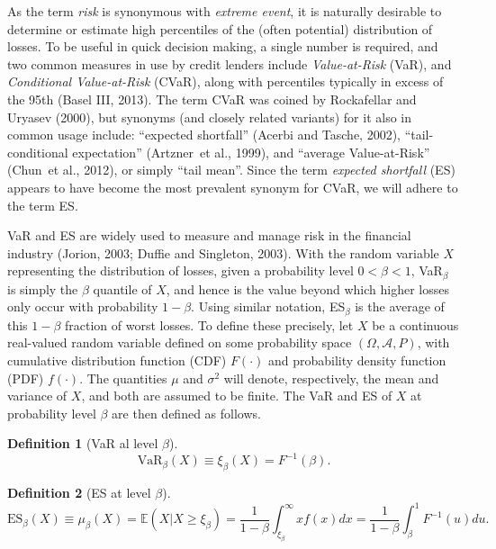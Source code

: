 \documentclass[11pt]{article}
\newcommand{\E}{\mathbb{E}}
\newcommand{\etal}{et al.}
\newcommand{\var}{\ensuremath{\xi_{\beta}}}
\newcommand{\cvar}{\ensuremath{\mu_{\beta}}}
\newcommand{\al}{\ensuremath{\beta}}
\newcommand{\nc}{\normalcolor}
\newtheorem{defn}{Definition}%
\begin{document}
As the term \emph{risk} is synonymous
with \emph{extreme event}, it is naturally desirable to determine or
estimate high percentiles of the (often potential) distribution of
losses. To be useful in quick decision making, a single number is
required, and two common measures in use by credit lenders include  \emph{Value-at-Risk} (VaR), and \emph{Conditional
Value-at-Risk} (CVaR), along with percentiles typically in excess
of the 95th (Basel III, 2013).
The term CVaR was coined by Rockafellar and
Uryasev (2000), but synonyms (and closely related variants) for it also in common usage include: ``expected shortfall'' (Acerbi
and Tasche, 2002), ``tail-conditional expectation'' (Artzner~\etal{},
1999), and ``average Value-at-Risk'' (Chun~\etal{},
2012), or simply ``tail mean''. 
Since the term \emph{expected
shortfall} (ES) appears to have become the most prevalent synonym for CVaR, we
will adhere to the term ES.\nc

VaR and ES  are widely used to measure and manage risk in the financial
industry (Jorion, 2003; Duffie and Singleton, 2003). With the random
variable $X$ representing the distribution of losses, given a probability level $0<\al<1$,
VaR$_{\al}$ is simply the $\al$ quantile of $X$, and hence is the
value beyond which higher losses only occur with probability
$1-\al$. Using similar notation, ES$_{\al}$ is the average of
this $1-\al$ fraction of worst losses. To define these precisely, let $X$ be a continuous real-valued random variable defined
on some probability space $(\Omega,\mathcal{A},P)$, with cumulative
  distribution function (CDF) $F(\cdot)$ and probability density
function (PDF) $f(\cdot)$. The quantities $\mu$ and
  $\sigma^2$ will denote, respectively, the mean and variance of
  $X$, and both are assumed to be finite. The
VaR and ES of $X$ at probability level $\al$ are then defined as follows.
\begin{defn}[VaR al level $\al$]
\begin{equation}\label{var_d}
\mathrm{VaR}_{\al}(X)\equiv\var(X) = F^{-1}(\al). 
\end{equation}
\end{defn}
%
\begin{defn}[ES at level $\al$]
\begin{equation}\label{cvar_d}
\mathrm{ES}_{\al}(X)\equiv\cvar(X) = \E(X|X\geq \var)= \frac{1}{1-\al}\int_{\var}^\infty xf(x)dx = \frac{1}{1-\al}\int_{\al}^1 F^{-1}(u)du.
\end{equation}
\end{defn}
%
\end{document}
